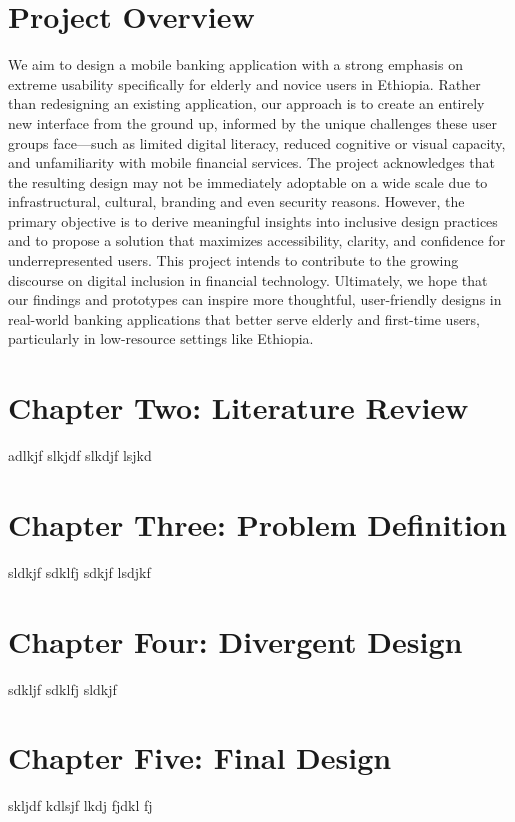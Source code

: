 \documentclass[a4paper,12pt]{report}
\begin{document}
\section{Project Overview}
We aim to design a mobile banking application with a strong emphasis on extreme usability specifically for elderly and novice users in Ethiopia. Rather than redesigning an existing application, our approach is to create an entirely new interface from the ground up, informed by the unique challenges these user groups face—such as limited digital literacy, reduced cognitive or visual capacity, and unfamiliarity with mobile financial services. The project acknowledges that the resulting design may not be immediately adoptable on a wide scale due to infrastructural, cultural, branding and even security reasons. However, the primary objective is to derive meaningful insights into inclusive design practices and to propose a solution that maximizes accessibility, clarity, and confidence for underrepresented users. This project intends to contribute to the growing discourse on digital inclusion in financial technology. Ultimately, we hope that our findings and prototypes can inspire more thoughtful, user-friendly designs in real-world banking applications that better serve elderly and first-time users, particularly in low-resource settings like Ethiopia.


\newpage
\section*{Chapter Two: Literature Review}
adlkjf slkjdf slkdjf lsjkd
\vfill

\newpage
\section*{Chapter Three: Problem Definition}
sldkjf sdklfj sdkjf lsdjkf
\vfill

\newpage
\section*{Chapter Four: Divergent Design}
sdkljf sdklfj sldkjf
\vfill

\newpage
\section*{Chapter Five: Final Design}
skljdf kdlsjf lkdj fjdkl fj
\vfill
\end{document}
